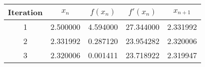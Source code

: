 \begin{tabular}{|c|c|c|c|c|}
\hline
Iteration & $x_n$ & $f(x_n)$ & $f'(x_n)$ & $x_{n+1}$ \\
\hline
1 & 2.500000 & 4.594000 & 27.344000 & 2.331992 \\
\hline
2 & 2.331992 & 0.287120 & 23.954282 & 2.320006 \\
\hline
3 & 2.320006 & 0.001411 & 23.718922 & 2.319947 \\
\hline
\end{tabular}